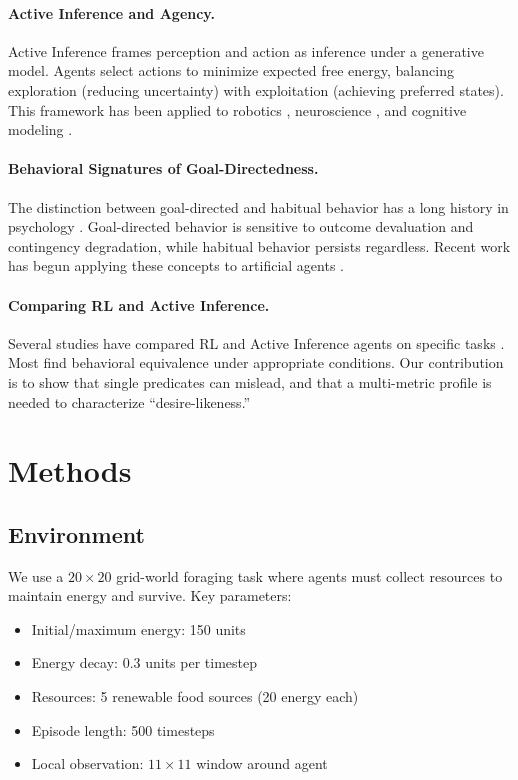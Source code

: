 \documentclass{article}
\begin{document}
\paragraph{Active Inference and Agency.} Active Inference \cite{friston2010free} frames perception and action as inference under a generative model. Agents select actions to minimize expected free energy, balancing exploration (reducing uncertainty) with exploitation (achieving preferred states). This framework has been applied to robotics \cite{lanillos2021active}, neuroscience \cite{parr2022active}, and cognitive modeling \cite{smith2022step}.

\paragraph{Behavioral Signatures of Goal-Directedness.} The distinction between goal-directed and habitual behavior has a long history in psychology \cite{dickinson1985actions}. Goal-directed behavior is sensitive to outcome devaluation and contingency degradation, while habitual behavior persists regardless. Recent work has begun applying these concepts to artificial agents \cite{langdon2022model}.

\paragraph{Comparing RL and Active Inference.} Several studies have compared RL and Active Inference agents on specific tasks \cite{millidge2020relationship, tschantz2020reinforcement}. Most find behavioral equivalence under appropriate conditions. Our contribution is to show that single predicates can mislead, and that a multi-metric profile is needed to characterize ``desire-likeness.''

\section{Methods}

\subsection{Environment}

We use a $20 \times 20$ grid-world foraging task where agents must collect resources to maintain energy and survive. Key parameters:
\begin{itemize}
    \item Initial/maximum energy: 150 units
    \item Energy decay: 0.3 units per timestep
    \item Resources: 5 renewable food sources (20 energy each)
    \item Episode length: 500 timesteps
    \item Local observation: $11 \times 11$ window around agent
\end{itemize}
\end{document}
